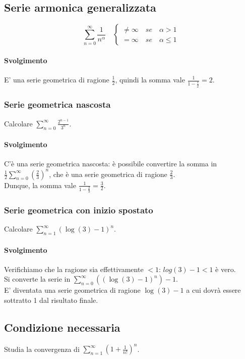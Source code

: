 \documentclass{article}
\begin{document}
\subsection{Serie armonica generalizzata}
\[\sum^{\infty}_{n=0} \frac{1}{n^\alpha} \quad
\begin{cases}
\neq \infty \quad se \quad \alpha > 1\\
= \infty \quad se \quad \alpha \leq 1
\end{cases}
\]

\paragraph{Svolgimento}
E' una serie geometrica di ragione \(\frac{1}{2}\), quindi la somma vale \(\frac{1}{1-\frac{1}{2}} = 2\).

\subsubsection{Serie geometrica nascosta}
Calcolare \(\sum^{\infty}_{n=0}\frac{2^{n-1}}{3^n}\).\\

\paragraph{Svolgimento}
C'è una serie geometrica nascosta: è possibile convertire la somma in \(\frac{1}{2} \sum^{\infty}_{n=0}(\frac{2}{3})^n\), che è una serie geometrica di ragione \(\frac{2}{3}\).\\
Dunque, la somma vale \(\frac{1}{1-\frac{2}{3}} = \frac{3}{2}\).

\subsubsection{Serie geometrica con inizio spostato}
Calcolare \(\sum^{\infty}_{n=1}(\log(3) - 1)^n\).

\paragraph{Svolgimento}
Verifichiamo che la ragione sia effettivamente \(< 1\): \(log(3) - 1 < 1\) è vero.\\
Si converte la serie in \(\sum^{\infty}_{n=0}((\log(3) - 1)^n) - 1\).\\
E' diventata una serie geometrica di ragione \(\log(3) - 1\) a cui dovrà essere sottratto 1 dal risultato finale.

\subsection{Condizione necessaria}
Studia la convergenza di \(\sum^{\infty}_{n=1}(1 + \frac{1}{n!})^n\).
\end{document}
